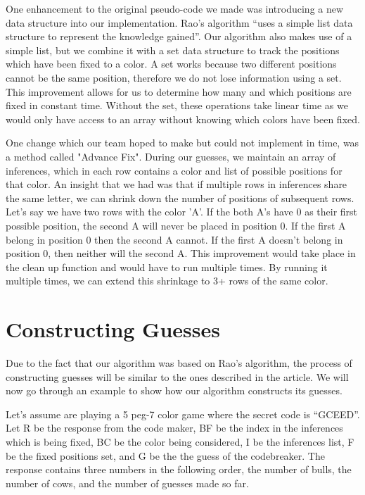 \documentclass[11pt]{article}
\begin{document}
    One enhancement to the original pseudo-code we made was introducing a new data structure into our implementation. Rao's algorithm \enquote{uses a simple list data structure to represent the knowledge gained}\autocite{rao}. Our algorithm also makes use of a simple list, but we combine it with a set data structure to track the positions which have been fixed to a color. A set works because two different positions cannot be the same position, therefore we do not lose information using a set. This improvement allows for us to determine how many and which positions are fixed in constant time. Without the set, these operations take linear time as we would only have access to an array without knowing which colors have been fixed. 
    
    One change which our team hoped to make but could not implement in time, was a method called "Advance Fix". During our guesses, we maintain an array of inferences, which in each row contains a color and list of possible positions for that color. An insight that we had was that if multiple rows in inferences share the same letter, we can shrink down the number of positions of subsequent rows. Let's say we have two rows with the color 'A'. If the both A's have 0 as their first possible position, the second A will never be placed in position 0. If the first A belong in position 0 then the second A cannot. If the first A doesn't belong in position 0, then neither will the second A. This improvement would take place in the clean up function and would have to run multiple times. By running it multiple times, we can extend this shrinkage to 3+ rows of the same color.

    \section{Constructing Guesses}
    Due to the fact that our algorithm was based on Rao's algorithm, the process of constructing guesses will be similar to the ones described in the article\autocite{rao}. We will now go through an example to show how our algorithm constructs its guesses.

    Let's assume are playing a 5 peg-7 color game where the secret code is \enquote{GCEED}. Let R be the response from the code maker, BF be the index in the inferences which is being fixed, BC be the color being considered, I be the inferences list, F be the fixed positions set, and G be the the guess of the codebreaker. The response contains three numbers in the following order, the number of bulls, the number of cows, and the number of guesses made so far.\\
\end{document}
